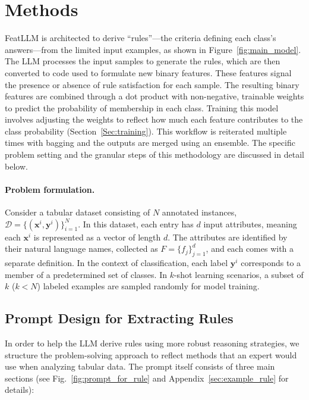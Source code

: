 \section{Methods}
\textsf{FeatLLM} is architected to derive ``rules''—the criteria defining each class's answers—from the limited input examples, as shown in Figure~\ref{fig:main_model}. The LLM processes the input samples to generate the rules, which are then converted to code used to formulate new binary features. These features signal the presence or absence of rule satisfaction for each sample. The resulting binary features are combined through a dot product with non-negative, trainable weights to predict the probability of membership in each class. Training this model involves adjusting the weights to reflect how much each feature contributes to the class probability (Section~\ref{Sec:training}). This workflow is reiterated multiple times with bagging and the outputs are merged using an ensemble. The specific problem setting and the granular steps of this methodology are discussed in detail below.

\vspace*{-0.12in}
\paragraph{Problem formulation.} Consider a tabular dataset consisting of $N$ annotated instances, $\mathcal{D} = \{(\mathbf{x}^i, \mathbf{y}^i)\}_{i=1}^{N}$. In this dataset, each entry has $d$ input attributes, meaning each $\mathbf{x}^i$ is represented as a vector of length $d$. The attributes are identified by their natural language names, collected as $F = \{f_j\}_{j=1}^{d}$, and each comes with a separate definition. In the context of classification, each label $\mathbf{y}^i$ corresponds to a member of a predetermined set of classes. In $k$-shot learning scenarios, a subset of $k$ ($k < N$) labeled examples are sampled randomly for model training.

\subsection{Prompt Design for Extracting Rules}
\label{Sec:prompt_design}
In order to help the LLM derive rules using more robust reasoning strategies, we structure the problem-solving approach to reflect methods that an expert would use when analyzing tabular data. The prompt itself consists of three main sections (see Fig.~\ref{fig:prompt_for_rule} and Appendix~\ref{sec:example_rule} for details):

